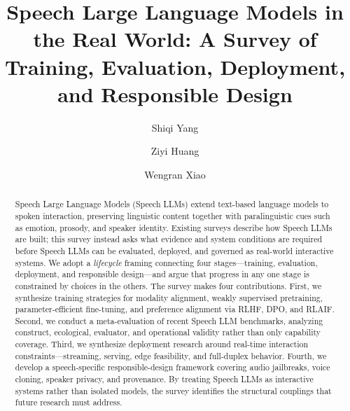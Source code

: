 \documentclass[a4paper,fleqn]{cas-sc}
\begin{document}
\let\WriteBookmarks\relax
\def\floatpagepagefraction{1}
\def\textpagefraction{.001}


\title[mode=title]{Speech Large Language Models in the Real World: A Survey of Training, Evaluation, Deployment, and Responsible Design}

\author[1]{Shiqi Yang}\cormark[1]

\author[2]{Ziyi Huang}

\author[3]{Wengran Xiao}



\begin{abstract}
Speech Large Language Models (Speech LLMs) extend text-based language models to spoken interaction, preserving linguistic content together with paralinguistic cues such as emotion, prosody, and speaker identity. Existing surveys describe how Speech LLMs are built; this survey instead asks what evidence and system conditions are required before Speech LLMs can be evaluated, deployed, and governed as real-world interactive systems. We adopt a \emph{lifecycle} framing connecting four stages---training, evaluation, deployment, and responsible design---and argue that progress in any one stage is constrained by choices in the others. The survey makes four contributions. First, we synthesize training strategies for modality alignment, weakly supervised pretraining, parameter-efficient fine-tuning, and preference alignment via RLHF, DPO, and RLAIF. Second, we conduct a meta-evaluation of recent Speech LLM benchmarks, analyzing construct, ecological, evaluator, and operational validity rather than only capability coverage. Third, we synthesize deployment research around real-time interaction constraints---streaming, serving, edge feasibility, and full-duplex behavior. Fourth, we develop a speech-specific responsible-design framework covering audio jailbreaks, voice cloning, speaker privacy, and provenance. By treating Speech LLMs as interactive systems rather than isolated models, the survey identifies the structural couplings that future research must address.
\end{abstract}
\end{document}
